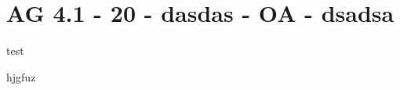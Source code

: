 \section{AG 4.1 - 20 - dasdas - OA - dsadsa}

\begin{beispiel}[AG 4.1]{1}
test

hjgfuz
\end{beispiel}